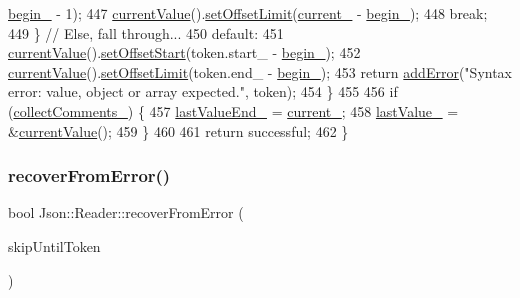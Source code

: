 \begin{DoxyCode}
      \hyperlink{class_json_1_1_reader_a327166839022ea91f0a8290960a8af76}{begin\_} - 1);
447       \hyperlink{class_json_1_1_reader_a85597f763fb0148a17359b6dfc6f7326}{currentValue}().\hyperlink{class_json_1_1_value_a5e4f5853fec138150c5df6004a8c2bcf}{setOffsetLimit}(\hyperlink{class_json_1_1_reader_a2f2feb5201a26da7aa133d2f7434479b}{current\_} - 
      \hyperlink{class_json_1_1_reader_a327166839022ea91f0a8290960a8af76}{begin\_});
448       \textcolor{keywordflow}{break};
449     \} \textcolor{comment}{// Else, fall through...}
450   \textcolor{keywordflow}{default}:
451     \hyperlink{class_json_1_1_reader_a85597f763fb0148a17359b6dfc6f7326}{currentValue}().\hyperlink{class_json_1_1_value_a92e32ea0f4f8a15853a3cf0beac9feb9}{setOffsetStart}(token.start\_ - 
      \hyperlink{class_json_1_1_reader_a327166839022ea91f0a8290960a8af76}{begin\_});
452     \hyperlink{class_json_1_1_reader_a85597f763fb0148a17359b6dfc6f7326}{currentValue}().\hyperlink{class_json_1_1_value_a5e4f5853fec138150c5df6004a8c2bcf}{setOffsetLimit}(token.end\_ - \hyperlink{class_json_1_1_reader_a327166839022ea91f0a8290960a8af76}{begin\_});
453     \textcolor{keywordflow}{return} \hyperlink{class_json_1_1_reader_af02176a1d2786b4415bbb00a1b10bb6b}{addError}(\textcolor{stringliteral}{"Syntax error: value, object or array expected."}, token);
454   \}
455 
456   \textcolor{keywordflow}{if} (\hyperlink{class_json_1_1_reader_a8e9ce743f6004f0596692f0a9ee4626c}{collectComments\_}) \{
457     \hyperlink{class_json_1_1_reader_a497a114f7b760f1b794b8fff9876615a}{lastValueEnd\_} = \hyperlink{class_json_1_1_reader_a2f2feb5201a26da7aa133d2f7434479b}{current\_};
458     \hyperlink{class_json_1_1_reader_a87cc75ae5adc6a6755f0ba1c7255ff6c}{lastValue\_} = &\hyperlink{class_json_1_1_reader_a85597f763fb0148a17359b6dfc6f7326}{currentValue}();
459   \}
460 
461   \textcolor{keywordflow}{return} successful;
462 \}
\end{DoxyCode}
\mbox{\label{class_json_1_1_reader_a8d4ed03a43082c5ace81ba5b81425eaf}} 
\subsubsection{\texorpdfstring{recover\+From\+Error()}{recoverFromError()}}
{\footnotesize\ttfamily bool Json\+::\+Reader\+::recover\+From\+Error (\begin{DoxyParamCaption}\item[{\hyperlink{class_json_1_1_reader_aa35e6ab574dc399a0a645ad98ed66bc9}{Token\+Type}}]{skip\+Until\+Token }\end{DoxyParamCaption})\hspace{0.3cm}{\ttfamily [private]}}



